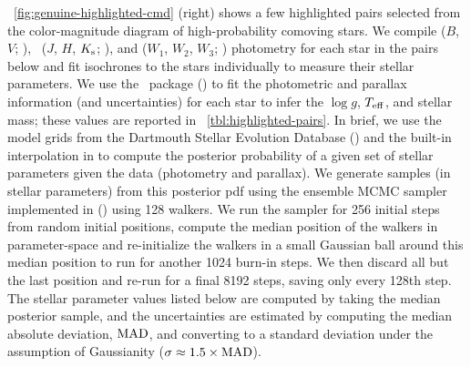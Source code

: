 \documentclass[modern, letterpaper]{aastex61}
\newcommand{\tmass}{\acronym{2MASS}}
\newcommand{\logg}{\ensuremath{\ensuremath{\log g}}}
\newcommand{\teff}{\ensuremath{\ensuremath{T_{\rm eff}}}}
\begin{document}
\figurename~\ref{fig:genuine-highlighted-cmd} (right) shows a few highlighted
pairs selected from the color-magnitude diagram of high-probability comoving
stars.
We compile  ($B$, $V$; \citealt{Hog:2000}), \tmass\
($J$, $H$, $K_{\rm s}$; \citealt{Skrutskie:2006}), and  ($W_1$,
$W_2$, $W_3$; \citealt{Wright:2010}) photometry for each star in the pairs below
and fit isochrones to the stars individually to measure their stellar
parameters.
We use the  \python\ package (\citealt{Morton:2015}) to fit
the photometric and parallax information (and uncertainties) for each star to
infer the \logg, \teff, and stellar mass; these values are reported in
\tablename~\ref{tbl:highlighted-pairs}.
In brief, we use the model grids from the Dartmouth Stellar Evolution Database
(\citealt{Dotter:2008}) and the built-in interpolation in \package{isochrones}
to compute the posterior probability of a given set of stellar parameters given
the data (photometry and parallax).
We generate samples (in stellar parameters) from this posterior pdf using the
ensemble MCMC sampler implemented in \package{emcee}
(\citealt{Foreman-Mackey:2013}) using 128 walkers.
We run the sampler for 256 initial steps from random initial positions, compute
the median position of the walkers in parameter-space and re-initialize the
walkers in a small Gaussian ball around this median position to run for another
1024 burn-in steps.
We then discard all but the last position and re-run for a final 8192 steps,
saving only every 128th step.
The stellar parameter values listed below are computed by taking the median
posterior sample, and the uncertainties are estimated by computing the median
absolute deviation, ${\rm MAD}$, and converting to a standard deviation under
the assumption of Gaussianity ($\sigma \approx 1.5 \times {\rm MAD}$).
\end{document}
